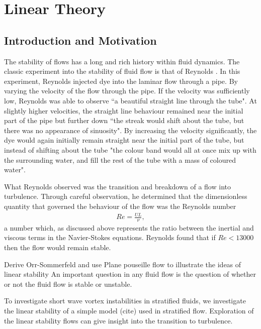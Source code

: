 \chapter{Linear Theory}

\section{Introduction and Motivation}
The stability of flows has a long and rich history within fluid dynamics. The classic experiment into the stability of fluid flow is that of  Reynolds \cite{reynolds1883}. In this experiment, Reynolds injected dye into the laminar flow through a pipe. By varying the velocity of the flow through the pipe. If the velocity was sufficiently low, Reynolds was able to observe ``a beautiful straight line through the tube". At slightly higher velocities, the straight line behaviour remained near the initial part of the pipe but further down ``the streak would shift about the tube, but there was no appearance of sinuosity". By increasing the velocity significantly, the dye would again initially remain straight near the initial part of the tube, but instead of shifting about the tube "the colour band would all at once mix up with the surrounding water, and fill the rest of the tube with a mass of coloured water". 

What Reynolds observed was the transition and breakdown of a flow into turbulence. Through careful observation, he determined that the dimensionless quantity that governed the behaviour of the flow was the Reynolds number 
\begin{align}
Re =\frac{UL}{\nu},
\end{align}
a number which, as discussed above represents the ratio between the inertial and viscous terms in the Navier-Stokes equations. Reynolds found that if $Re<13000$ then the flow would remain stable. 

Derive Orr-Sommerfeld and use Plane pouseille flow to illustrate the ideas of linear stability 
An important question in any fluid flow is the question of whether or not the fluid flow is stable or unstable. 


To investigate short wave vortex instabilities in stratified fluids, we investigate the linear stability of a simple model (cite) used in stratified flow. Exploration of the linear stability flows can give insight into the transition to turbulence. 

